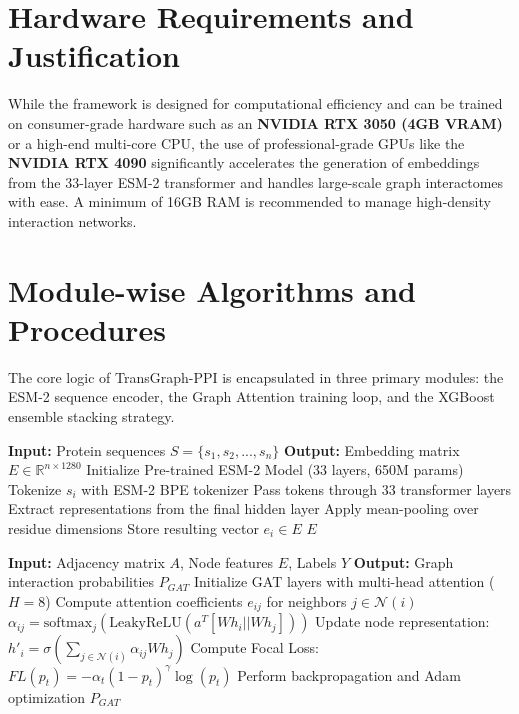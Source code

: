 \documentclass[12pt,a4paper]{report}
\begin{document}
\section{Hardware Requirements and Justification}
While the framework is designed for computational efficiency and can be trained on consumer-grade hardware such as an \textbf{NVIDIA RTX 3050 (4GB VRAM)} or a high-end multi-core CPU, the use of professional-grade GPUs like the \textbf{NVIDIA RTX 4090} significantly accelerates the generation of embeddings from the 33-layer ESM-2 transformer and handles large-scale graph interactomes with ease. A minimum of 16GB RAM is recommended to manage high-density interaction networks.

\section{Module-wise Algorithms and Procedures}
The core logic of TransGraph-PPI is encapsulated in three primary modules: the ESM-2 sequence encoder, the Graph Attention training loop, and the XGBoost ensemble stacking strategy.

\begin{algorithm}[H]
\caption{ESM-2 Embedding Extraction}
\begin{algorithmic}[1]
\STATE \textbf{Input:} Protein sequences $S = \{s_1, s_2, ..., s_n\}$
\STATE \textbf{Output:} Embedding matrix $E \in \mathbb{R}^{n \times 1280}$
\STATE Initialize Pre-trained ESM-2 Model (33 layers, 650M params)
    \STATE Tokenize $s_i$ with ESM-2 BPE tokenizer
    \STATE Pass tokens through 33 transformer layers
    \STATE Extract representations from the final hidden layer
    \STATE Apply mean-pooling over residue dimensions
    \STATE Store resulting vector $e_i \in E$
\ENDFOR
\RETURN $E$
\end{algorithmic}
\end{algorithm}

\begin{algorithm}[H]
\caption{GAT Message Passing and Training}
\begin{algorithmic}[1]
\STATE \textbf{Input:} Adjacency matrix $A$, Node features $E$, Labels $Y$
\STATE \textbf{Output:} Graph interaction probabilities $P_{GAT}$
\STATE Initialize GAT layers with multi-head attention ($H=8$)
        \STATE Compute attention coefficients $e_{ij}$ for neighbors $j \in \mathcal{N}(i)$
        \STATE $\alpha_{ij} = \text{softmax}_j(\text{LeakyReLU}(a^T [Wh_i || Wh_j]))$
        \STATE Update node representation: $h'_i = \sigma(\sum_{j \in \mathcal{N}(i)} \alpha_{ij} Wh_j)$
    \ENDFOR
    \STATE Compute Focal Loss: $FL(p_t) = -\alpha_t (1-p_t)^\gamma \log(p_t)$
    \STATE Perform backpropagation and Adam optimization
\ENDFOR
\RETURN $P_{GAT}$
\end{algorithmic}
\end{algorithm}
\end{document}
